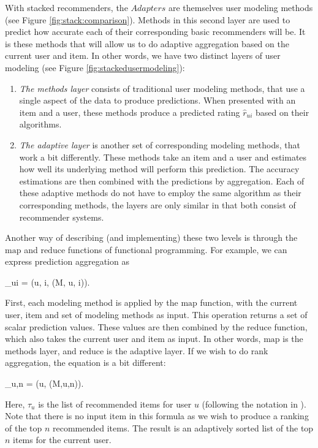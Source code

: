 With stacked recommenders, the $Adapters$ are themselves user modeling methods 
(see Figure \ref{fig:stack:comparison}).
Methods in this second layer are used to predict how accurate each of their corresponding basic recommenders will be.
It is these methods that will allow us to do adaptive aggregation based on the current user and item.
In other words, we have two distinct layers of user modeling 
(see Figure \ref{fig:stackedusermodeling}):



\begin{enumerate}
  \item
    \emph{The methods layer} consists of traditional user modeling methods, that use a single aspect of the data to produce predictions.
    When presented with an item and a user, these methods produce a predicted rating $\hat{r}_{ui}$ based on their algorithms.
  \item
    \emph{The adaptive layer} is another set of corresponding modeling methods, that work a bit differently.
    These methods take an item and a user and estimates how well its underlying method will perform this prediction.
    The accuracy estimations are then combined with the predictions by aggregation.
    Each of these adaptive methods do not have to employ the same algorithm as their corresponding methods,
    the layers are only similar in that both consist of recommender systems.
\end{enumerate}

Another way of describing (and implementing) these two levels is through 
the $\mathrm{map}$ and $\mathrm{reduce}$ functions of functional programming.
For example, we can express prediction aggregation as 

\begin{eqsp}
  _{ui} = (u, i, (M, u, i)).
\end{eqsp}
%
First, each modeling method is applied by the $\mathrm{map}$ function, with the current user, item and set of modeling methods as input.
This operation returns a set of scalar prediction values. 
These values are then combined by the $\mathrm{reduce}$ function, which also takes the current user and item as input.
In other words, $\mathrm{map}$ is the methods layer, and $\mathrm{reduce}$ is the adaptive layer.
If we wish to do rank aggregation, the equation is a bit different:

\begin{eqsp}
  \tau_{u,n} = (u, (M,u,n)).
\end{eqsp}
%
Here, $\tau_{u}$ is the list of recommended items for user $u$ (following the notation in \citet[p3]{Dwork2001}).
Note that there is no input item in this formula as we wish to produce a ranking of the top $n$ recommended items.
The result is an adaptively sorted list of the top $n$ items for the current user.

